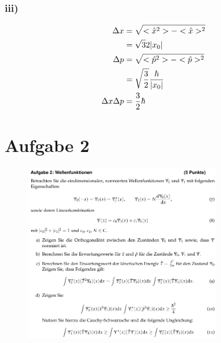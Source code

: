 \subsubsection{iii)}
\begin{align}
\Delta x&= \sqrt{<\hat x ^2>-<\hat x>^2 }\\
&=\sqrt{3}{2} \lvert x_0\rvert\\
\Delta p &= \sqrt{<\hat p ^2>-<\hat p >^2}\\
&=\sqrt{\frac{3}{2}}\frac{\hbar}{\lvert x_0\rvert}\\
\Delta x \Delta p &= \frac{3}{2} \hbar 
\end{align}

%
%
%



\section{Aufgabe 2}

\begin{figure}[H]
    \centering
    \includegraphics[width=0.75\textwidth]{images/Aufgabe_2.jpg}
    \label{fig:2}
\end{figure}

